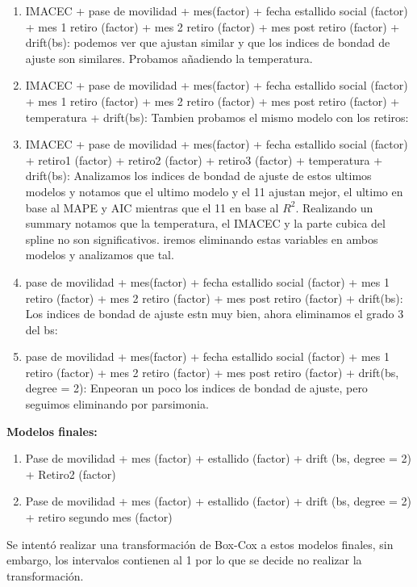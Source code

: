 \documentclass[10pt,A4]{article}
\begin{document}
\begin{enumerate}
        \item IMACEC + pase de movilidad + mes(factor) + fecha estallido social (factor) + mes 1 retiro (factor) + mes 2 retiro (factor) + mes post retiro (factor) + drift(bs): podemos ver que ajustan similar y que los indices de bondad de ajuste son similares. Probamos añadiendo la temperatura.
        \item IMACEC + pase de movilidad + mes(factor) + fecha estallido social (factor) + mes 1 retiro (factor) + mes 2 retiro (factor) + mes post retiro (factor) + temperatura + drift(bs): Tambien probamos el mismo modelo con los retiros:
        \item IMACEC + pase de movilidad + mes(factor) + fecha estallido social (factor) + retiro1 (factor) + retiro2 (factor) + retiro3 (factor) + temperatura + drift(bs): Analizamos los indices de bondad de ajuste de estos ultimos modelos y notamos que el ultimo modelo y el 11 ajustan mejor, el ultimo en base al MAPE y AIC mientras que el 11 en base al $R^2$. Realizando un summary notamos que la temperatura, el IMACEC y la parte cubica del spline no son significativos. iremos eliminando estas variables en ambos modelos y analizamos que tal.
        \item pase de movilidad + mes(factor) + fecha estallido social (factor) + mes 1 retiro (factor) + mes 2 retiro (factor) + mes post retiro (factor) + drift(bs): Los indices de bondad de ajuste estn muy bien, ahora eliminamos el grado 3 del bs:
        \item pase de movilidad + mes(factor) + fecha estallido social (factor) + mes 1 retiro (factor) + mes 2 retiro (factor) + mes post retiro (factor) + drift(bs, degree = 2): Enpeoran un poco los indices de bondad de ajuste, pero seguimos eliminando por parsimonia.
    \end{enumerate}

    \textbf{Modelos finales:}

    \begin{enumerate}
        \item Pase de movilidad + mes (factor) + estallido (factor) + drift (bs, degree = 2) + Retiro2 (factor)
        \item Pase de movilidad + mes (factor) + estallido (factor) + drift (bs, degree = 2) + retiro segundo mes (factor)
    \end{enumerate}

    Se intentó realizar una transformación de Box-Cox a estos modelos finales, sin embargo, los intervalos contienen
    al 1 por lo que se decide no realizar la transformación.
\end{document}
